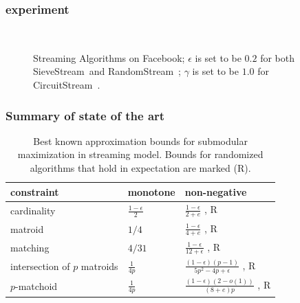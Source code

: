 \documentclass{beamer}
\newcommand{\eps}{\epsilon}
\newcommand{\sieveStream}{{\sc SieveStream}~}
\newcommand{\randomStream}{{\sc RandomStream}~}
\newcommand{\circuitStream}{{\sc CircuitStream}~}
\begin{document}
\begin{frame}
  \frametitle{experiment}
  
  \begin{figure}[h!]
    \centering
    ~~
    \caption{Streaming Algorithms on {\sc Facebook};  $\eps$ is set to be $0.2$ for both \sieveStream and \randomStream; $\gamma$ is set to be $1.0$ for \circuitStream.}
    \label{fig:streaming-facebook}
  \end{figure}
\end{frame}


\begin{frame}
  \frametitle{Summary of state of the art}
\begin{table}[t]
\centering
\begin{tabular}{|l|l|l|}
\hline
constraint & monotone  &  non-negative \\
\hline
cardinality & $\frac{1-\eps}{2}$ \cite{BMK+14} & $\frac{1 - \eps}{2 + e}$ \cite{CGQ15}, R\\
\hline
matroid & $1/4$ \cite{CK14} & $\frac{1 - \eps}{4 + e}$ \cite{CGQ15},  R \\
\hline
matching & $4/31$ \cite{CK14} & $\frac{1 - \eps}{12 + \eps}$ \cite{CGQ15}, R \\
\hline
intersection of $p$ matroids & $\frac{1}{4p}$ \cite{CK14} & $\frac{(1 - \eps)(p - 1)}{5p^2 -4p + \eps}$ \cite{CGQ15}, R\\
\hline
$p$-matchoid & $\frac{1}{4p}$ \cite{CGQ15} & $\frac{(1-\eps)(2-o(1))}{(8+e)p}$ \cite{CGQ15}, R\\
\hline
\end{tabular}
\caption{Best known approximation bounds for submodular maximization in streaming model. Bounds for randomized algorithms that hold in expectation are marked (R).}
\label{table:streaming}
\end{table}

\end{frame}
\end{document}
